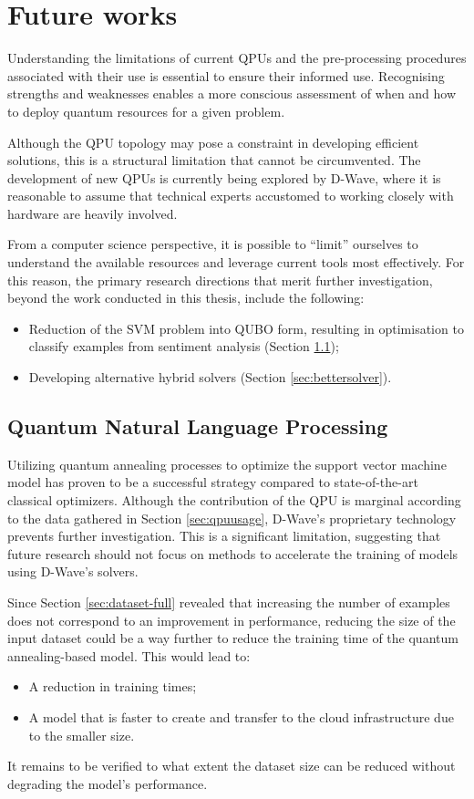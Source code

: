 \chapter{Future works}\label{sec:future}

Understanding the limitations of current QPUs and the pre-processing procedures associated with their use is essential to ensure their informed use. Recognising strengths and weaknesses enables a more conscious assessment of when and how to deploy quantum resources for a given problem.

Although the QPU topology may pose a constraint in developing efficient solutions, this is a structural limitation that cannot be circumvented. The development of new QPUs is currently being explored by D-Wave, where it is reasonable to assume that technical experts accustomed to working closely with hardware are heavily involved.

From a computer science perspective, it is possible to ``limit'' ourselves to understand the available resources and leverage current tools most effectively. For this reason, the primary research directions that merit further investigation, beyond the work conducted in this thesis, include the following:

\begin{itemize}
    \item Reduction of the SVM problem into QUBO form, resulting in optimisation to classify examples from sentiment analysis (Section \ref{sec:qnlp});
    \item Developing alternative hybrid solvers (Section \ref{sec:bettersolver}).
\end{itemize}

\section{Quantum Natural Language Processing}\label{sec:qnlp}

Utilizing quantum annealing processes to optimize the support vector machine model has proven to be a successful strategy compared to state-of-the-art classical optimizers. Although the contribution of the QPU is marginal according to the data gathered in Section \ref{sec:qpuusage}, D-Wave's proprietary technology prevents further investigation. This is a significant limitation, suggesting that future research should not focus on methods to accelerate the training of models using D-Wave's solvers.

Since Section \ref{sec:dataset-full} revealed that increasing the number of examples does not correspond to an improvement in performance, reducing the size of the input dataset could be a way further to reduce the training time of the quantum annealing-based model. This would lead to:
\begin{itemize}
    \item A reduction in training times;
    \item A model that is faster to create and transfer to the cloud infrastructure due to the smaller size.
\end{itemize}
It remains to be verified to what extent the dataset size can be reduced without degrading the model's performance.

